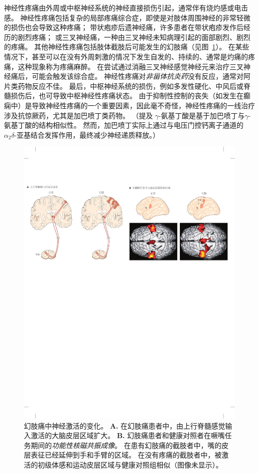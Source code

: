 神经性疼痛由外周或中枢神经系统的神经直接损伤引起，通常伴有烧灼感或电击感。
神经性疼痛包括复杂的局部疼痛综合症，即使是对肢体周围神经的非常轻微的损伤也会导致这种疼痛；
带状疱疹后遗神经痛，许多患者在带状疱疹发作后经历的剧烈疼痛；
或三叉神经痛，一种由三叉神经未知病理引起的面部剧烈、剧烈的疼痛。
其他神经性疼痛包括肢体截肢后可能发生的幻肢痛（见图~\ref{fig:20_14}）。
在某些情况下，甚至可以在没有外周刺激的情况下发生自发的、持续的、通常是灼痛的疼痛，这种现象称为疼痛麻醉。
在尝试通过消融三叉神经感觉神经元来治疗三叉神经痛后，可能会触发该综合症。
神经性疼痛对\textit{非甾体抗炎药}没有反应，通常对阿片类药物反应不佳。
最后，中枢神经系统的损伤，例如多发性硬化、中风后或脊髓损伤后，也可导致中枢神经性疼痛状态。
由于抑制性控制的丧失（如发生在癫痫中）是导致神经性疼痛的一个重要因素，因此毫不奇怪，神经性疼痛的一线治疗涉及抗惊厥药，尤其是加巴喷丁类药物。
（提及 $\gamma$-氨基丁酸是基于加巴喷丁与$\gamma$-氨基丁酸的结构相似性。
然而，加巴喷丁实际上通过与电压门控钙离子通道的 $ \alpha_2\delta $-亚基结合发挥作用，最终减少神经递质释放。）


\begin{figure}[htbp]
	\centering
	\includegraphics[width=1.0\linewidth]{chap20/fig_20_14}
	\caption{幻肢痛中神经激活的变化。
		\textbf{A.} 在幻肢痛患者中，由上行脊髓感觉输入激活的大脑皮层区域扩大。
		\textbf{B.} 幻肢痛患者和健康对照者在噘嘴任务期间的\textit{功能性核磁共振成像}。
		在患有幻肢痛的截肢者中，嘴的皮层表征已经延伸到手和手臂的区域。
		在没有疼痛的截肢者中，被激活的初级体感和运动皮层区域与健康对照组相似（图像未显示）\cite{flor2006phantom}。}
	\label{fig:20_14}
\end{figure}



